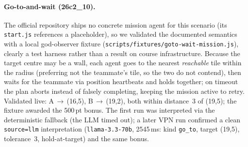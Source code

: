 \paragraph{Go-to-and-wait (26c2\_10).} The official repository ships no concrete
mission agent for this scenario (its \texttt{start.js} references a placeholder),
so we validated the documented semantics with a local god-observer fixture
(\texttt{scripts/fixtures/goto-wait-mission.js}), clearly a test harness rather
than a result on course infrastructure. Because the target centre may be a wall,
each agent goes to the nearest \emph{reachable} tile within the radius
(preferring not the teammate's tile, so the two do not contend), then waits for
the teammate via position heartbeats and holds together; on timeout the plan
aborts instead of falsely completing, keeping the mission active to retry.
Validated live: A\,$\to$\,(16,5), B\,$\to$\,(19,2), both within distance~3 of
(19,5); the fixture awarded the 500\,pt bonus. The first run was interpreted via
the deterministic fallback (the LLM timed out); a later VPN run confirmed a clean
\texttt{source=llm} interpretation (\texttt{llama-3.3-70b}, 2545\,ms: kind
\texttt{go\_to}, target (19,5), tolerance~3, hold-at-target) and the same bonus.
